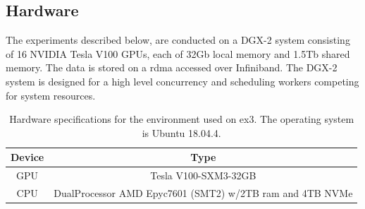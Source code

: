 \subsection{Hardware} \label{sec:hardware}
The experiments described below, are conducted on a 
DGX-2 system consisting of 16 NVIDIA Tesla V100 GPUs, each of 32Gb local memory and 1.5Tb shared memory. %
The data is stored on a \acrfull{rdma} accessed over Infiniband. %
The DGX-2 system is designed for a high level concurrency and scheduling workers competing for system resources.
\begin{table}[ht]
    \centering
    \begin{tabular}{c|c}
        Device &  Type  \\ \hline
        GPU & Tesla V100-SXM3-32GB \\
        CPU & DualProcessor AMD Epyc7601 (SMT2) w/2TB ram and 4TB NVMe 
    \end{tabular}
    \caption{Hardware specifications for the environment used on \acrshort{ex3}. The operating system is Ubuntu 18.04.4.}
    \label{tab:hardware_ex3}
\end{table}
